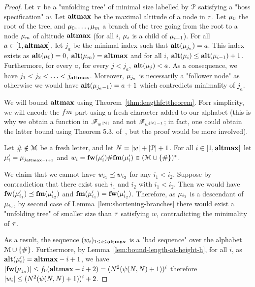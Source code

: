 \begin{proof}
	Let $\tau$ be a "unfolding tree" of minimal size labelled by $\mathcal{P}$ satisfying a "boss specification" $w$. Let $\mathbf{altmax}$ be the maximal altitude of a node in $\tau$. Let $\mu_0$ the root of the tree, and  $\mu_0, \ldots, \mu_m$ a branch of the tree going from the root to a node $\mu_m$ of altitude $\mathbf{altmax}$ (for all $i$, $\mu_i$ is a child of $\mu_{i-1}$).
	For all $a \in [1,\mathbf{altmax}]$, let $j_a$ be the minimal index such that $\mathbf{alt}(\mu_{j_a}) = a$. This index exists as $\mathbf{alt}(\mu_0) = 0$, $\mathbf{alt}(\mu_m) = \mathbf{altmax}$ and for all $i$, $\mathbf{alt}(\mu_{i}) \leq \mathbf{alt}(\mu_{i-1})+1$.
	Furthermore, for every $a$, for every $j < j_a$, $\mathbf{alt}(\mu_j) < a$. 
	As a consequence, we have $j_1 < j_2 < \ldots < j_{\mathbf{altmax}}$. Moreover, $\mu_{j_a}$ is necessarily a "follower node" as otherwise we would have $\mathbf{alt}(\mu_{j_a-1}) = a+1$ which contredicts minimality of $j_a$.
	
	We will bound $\mathbf{altmax}$ using Theorem~\ref{thm:lengthfcttheorem}. Forr simplicity, we will encode the $\followmessagespec$ part using a fresh character added to our alphabet (this is why we obtain a function in $\mathscr{F}_{w^{|\mathcal{M}|}}$ and not $\mathscr{F}_{w^{|\mathcal{M}|-1}}$; in fact, one could obtain the latter bound using Theorem 5.3. of~\cite{SchmitzS2011upperHigman}, but the proof would be more involved).

	Let $\# \notin \mathcal{M}$ be a fresh letter, and let $N = |w| + |\mathcal{P}|+1$. For all $i \in [1,\mathbf{altmax}]$ let $\mu'_i = \mu_{j_{\mathbf{altmax} - i+1}}$ and $w_i = \mathbf{fw}(\mu'_{i}) \# \mathbf{fm}(\mu'_{i}) \in (\mathcal{M} \cup \{\#\})^*$.
	
	We claim that we cannot have $w_{i_1}\preceq w_{i_2}$ for any  $i_1< i_2$.
	Suppose by contradiction that there exist such $i_1$ and $i_2$ with $i_1 < i_2$. Then we would have $\mathbf{fw}(\mu'_{i_1}) \preceq \mathbf{fm}(\mu'_{i_2})$ and $\mathbf{fm}(\mu'_{i_1}) = \mathbf{fw}(\mu'_{i_2})$.
	Therefore, as $\mu_{i_1}$ is a descendant of $\mu_{i_2}$, by second case of Lemma~\ref{lem:shortening-branches} there would exist a "unfolding tree" of smaller size than $\tau$ satisfying $w$, contradicting the minimality of $\tau$.
	
	As a result, the sequence $(w_i)_{1\leq i \leq \mathbf{altmax}}$ is a "bad sequence" over the alphabet $\mathcal{M}\cup\{\#\}$.
	Furthermore, by Lemma~\ref{lem:bound-length-at-height-h}, for all $i$, as $\mathbf{alt}(\mu'_{i}) = \mathbf{altmax}-i+1$, we have $|\mathbf{fw}(\mu_{j_a})| \leq f_0(\mathbf{altmax}-i+2) = (N^2(\psi(N,N)+1))^{i}$ therefore $|w_i| \leq (N^2(\psi(N,N)+1))^{i}+2$.
	

\end{proof}
